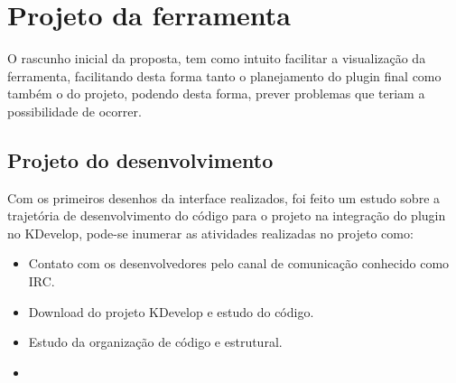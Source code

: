 \chapter{Projeto da ferramenta}
O rascunho inicial da proposta, tem como intuito facilitar a visualização da ferramenta, facilitando desta forma tanto o planejamento
do plugin final como também o do projeto, podendo desta forma, prever problemas que teriam a possibilidade de ocorrer.



\section{Projeto do desenvolvimento}
Com os primeiros desenhos da interface realizados, foi feito um estudo sobre a trajetória de desenvolvimento do código para o projeto
na integração do plugin no KDevelop, pode-se inumerar as atividades realizadas no projeto como:

\begin{itemize}
 \item Contato com os desenvolvedores pelo canal de comunicação conhecido como IRC.
 \item Download do projeto KDevelop e estudo do código.
 \item Estudo da organização de código e estrutural.
 \item {}
\end{itemize}

